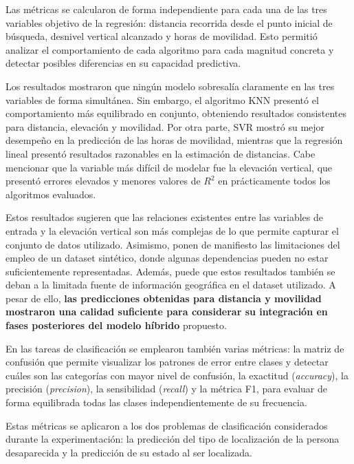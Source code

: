 Las métricas se calcularon de forma independiente para cada una de las tres variables objetivo de la regresión: distancia recorrida desde el punto inicial de búsqueda, desnivel vertical alcanzado y horas de movilidad. Esto permitió analizar el comportamiento de cada algoritmo para cada magnitud concreta y detectar posibles diferencias en su capacidad predictiva.


Los resultados mostraron que ningún modelo sobresalía claramente en las tres variables de forma simultánea. Sin embargo, el algoritmo KNN presentó el comportamiento más equilibrado en conjunto, obteniendo resultados consistentes para distancia, elevación y movilidad. Por otra parte, SVR mostró su mejor desempeño en la predicción de las horas de movilidad, mientras que la regresión lineal presentó resultados razonables en la estimación de distancias. Cabe mencionar que la variable más difícil de modelar fue la elevación vertical, que presentó errores elevados y menores valores de $R^2$ en prácticamente todos los algoritmos evaluados.

Estos resultados sugieren que las relaciones existentes entre las variables de entrada y la elevación vertical son más complejas de lo que permite capturar el conjunto de datos utilizado. Asimismo, ponen de manifiesto las limitaciones del empleo de un dataset sintético, donde algunas dependencias pueden no estar suficientemente representadas. Además, puede que estos resultados también se deban a la limitada fuente de información geográfica en el dataset utilizado. A pesar de ello, \textbf{las predicciones obtenidas para distancia y movilidad mostraron una calidad suficiente para considerar su integración en fases posteriores del modelo híbrido} propuesto.

En las tareas de clasificación se emplearon también varias métricas\cite{sklearn_metrics}: la matriz de confusión que permite visualizar los patrones de error entre clases y detectar cuáles son las categorías con mayor nivel de confusión, la exactitud (\textit{accuracy}), la precisión (\textit{precision}), la sensibilidad (\textit{recall}) y la métrica F1, para evaluar de forma equilibrada todas las clases independientemente de su frecuencia.

Estas métricas se aplicaron a los dos problemas de clasificación considerados durante la experimentación: la predicción del tipo de localización de la persona desaparecida y la predicción de su estado al ser localizada.

